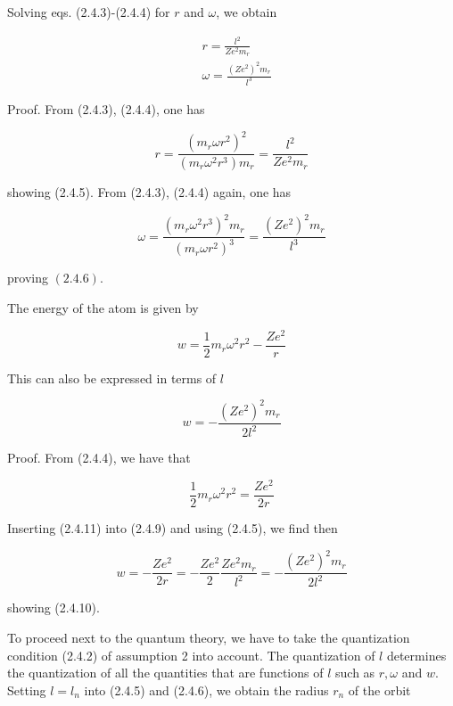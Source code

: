 \documentclass{article}
\begin{document}
Solving eqs. (2.4.3)-(2.4.4) for $r$ and $\omega$, we obtain
 
\begin{align*}
& r=\frac{l^{2}}{Z e^{2} m_{r}}  \tag{2.4.5}\\
& \omega=\frac{\left(Z e^{2}\right)^{2} m_{r}}{l^{3}} \tag{2.4.6}
\end{align*}
 

Proof. From (2.4.3), (2.4.4), one has
 
\begin{equation*}
r=\frac{\left(m_{r} \omega r^{2}\right)^{2}}{\left(m_{r} \omega^{2} r^{3}\right) m_{r}}=\frac{l^{2}}{Z e^{2} m_{r}} \tag{2.4.7}
\end{equation*}
 
showing (2.4.5). From (2.4.3), (2.4.4) again, one has
 
\begin{equation*}
\omega=\frac{\left(m_{r} \omega^{2} r^{3}\right)^{2} m_{r}}{\left(m_{r} \omega r^{2}\right)^{3}}=\frac{\left(Z e^{2}\right)^{2} m_{r}}{l^{3}} \tag{2.4.8}
\end{equation*}
 
proving $(2.4 .6)$.

The energy of the atom is given by
 
\begin{equation*}
w=\frac{1}{2} m_{r} \omega^{2} r^{2}-\frac{Z e^{2}}{r} \tag{2.4.9}
\end{equation*}
 

This can also be expressed in terms of $l$
 
\begin{equation*}
w=-\frac{\left(Z e^{2}\right)^{2} m_{r}}{2 l^{2}} \tag{2.4.10}
\end{equation*}
 

Proof. From (2.4.4), we have that
 
\begin{equation*}
\frac{1}{2} m_{r} \omega^{2} r^{2}=\frac{Z e^{2}}{2 r} \tag{2.4.11}
\end{equation*}
 

Inserting (2.4.11) into (2.4.9) and using (2.4.5), we find then
 
\begin{equation*}
w=-\frac{Z e^{2}}{2 r}=-\frac{Z e^{2}}{2} \frac{Z e^{2} m_{r}}{l^{2}}=-\frac{\left(Z e^{2}\right)^{2} m_{r}}{2 l^{2}} \tag{2.4.12}
\end{equation*}
 
showing (2.4.10).

To proceed next to the quantum theory, we have to take the quantization condition (2.4.2) of assumption 2 into account. The quantization of $l$ determines the quantization of all the quantities that are functions of $l$ such as $r, \omega$ and $w$. Setting $l=l_{n}$ into (2.4.5) and (2.4.6), we obtain the radius $r_{n}$ of the orbit
 
\end{document}

